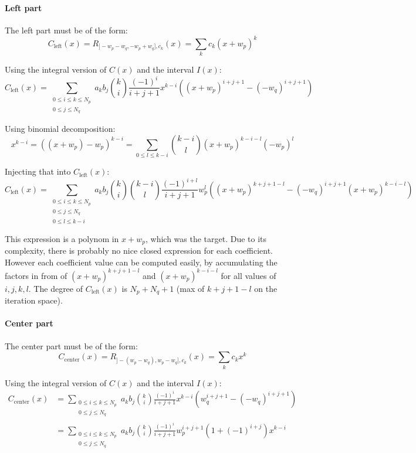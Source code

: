 \documentclass[a4paper,10pt]{article}
\begin{document}
\paragraph{Left part}
The left part must be of the form:
\[ C_\text{left}(x) = R_{]-w_p-w_q, -w_p+w_q], c_k}(x) = \sum_k c_k (x + w_p)^k \]

Using the integral version of $C(x)$ and the interval $I(x)$:
\[
    C_\text{left}(x) = \sum_{\substack{0 \le i \le k \le N_p \\ 0 \le j \le N_q}}
    a_k b_j \binom{k}{i} \frac{(-1)^i}{i+j+1} x^{k-i} \left( (x+w_p)^{i+j+1} - (-w_q)^{i+j+1} \right)
\]

Using binomial decomposition:
\[ x^{k-i} = ((x+w_p) - w_p)^{k-i} = \sum_{0 \le l \le k-i} \binom{k-i}{l} (x+w_p)^{k-i-l} (-w_p)^l \]

Injecting that into $C_\text{left}(x)$:
\[
    C_\text{left}(x) = \sum_{\substack{0 \le i \le k \le N_p \\ 0 \le j \le N_q \\ 0 \le l \le k-i}}
    a_k b_j \binom{k}{i} \binom{k-i}{l} \frac{(-1)^{i+l}}{i+j+1} w_p^l \left( (x+w_p)^{k+j+1-l} - (-w_q)^{i+j+1} (x+w_p)^{k-i-l} \right)
\]

This expression is a polynom in $x+w_p$, which was the target.
Due to its complexity, there is probably no nice closed expression for each coefficient.
However each coefficient value can be computed easily, by accumulating the factors in from of $(x+w_p)^{k+j+1-l}$ and $(x+w_p)^{k-i-l}$ for all values of $i,j,k,l$.
The degree of $C_\text{left}(x)$ is $N_p + N_q + 1$ (max of $k+j+1-l$ on the iteration space).

\paragraph{Center part}
The center part must be of the form:
\[ C_\text{center}(x) = R_{]-(w_p-w_q), w_p-w_q], c_k}(x) = \sum_k c_k x^k \]

Using the integral version of $C(x)$ and the interval $I(x)$:
\[ \begin{split}
    C_\text{center}(x)
    &= \sum_{\substack{0 \le i \le k \le N_p \\ 0 \le j \le N_q}} a_k b_j \binom{k}{i} \frac{(-1)^i}{i+j+1} x^{k-i} \left( w_q^{i+j+1} - (-w_q)^{i+j+1} \right) \\
    &= \sum_{\substack{0 \le i \le k \le N_p \\ 0 \le j \le N_q}} a_k b_j \binom{k}{i} \frac{(-1)^i}{i+j+1} w_p^{i+j+1} (1 + (-1)^{i+j}) x^{k-i}
\end{split} \]
\end{document}

